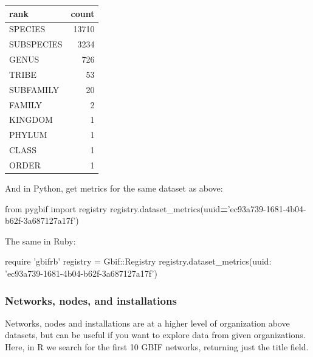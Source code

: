 \documentclass[author-year, review, 11pt]{components/elsarticle} %
\newenvironment{Shaded}{\begin{snugshade}}{\end{snugshade}}
\newcommand{\DataTypeTok}[1]{\textcolor[rgb]{0.13,0.29,0.53}{#1}}
\newcommand{\StringTok}[1]{\textcolor[rgb]{0.31,0.60,0.02}{#1}}
\newcommand{\ImportTok}[1]{#1}
\newcommand{\OperatorTok}[1]{\textcolor[rgb]{0.81,0.36,0.00}{\textbf{#1}}}
\newcommand{\NormalTok}[1]{#1}
\begin{document}
\begin{longtable}[]{@{}lr@{}}
\toprule
rank & count\tabularnewline
\midrule
\endhead
SPECIES & 13710\tabularnewline
SUBSPECIES & 3234\tabularnewline
GENUS & 726\tabularnewline
TRIBE & 53\tabularnewline
SUBFAMILY & 20\tabularnewline
FAMILY & 2\tabularnewline
KINGDOM & 1\tabularnewline
PHYLUM & 1\tabularnewline
CLASS & 1\tabularnewline
ORDER & 1\tabularnewline
\bottomrule
\end{longtable}

And in Python, get metrics for the same dataset as above:

\begin{Shaded}
\begin{Highlighting}[]
\ImportTok{from}\NormalTok{ pygbif }\ImportTok{import}\NormalTok{ registry}
\NormalTok{registry.dataset_metrics(uuid}\OperatorTok{=}\StringTok{'ec93a739-1681-4b04-b62f-3a687127a17f'}\NormalTok{)}
\end{Highlighting}
\end{Shaded}

The same in Ruby:

\begin{Shaded}
\begin{Highlighting}[]
\NormalTok{require }\StringTok{'gbifrb'}
\NormalTok{registry = }\DataTypeTok{Gbif}\NormalTok{::}\DataTypeTok{Registry}
\NormalTok{registry.dataset_metrics(}\StringTok{uuid: 'ec93a739-1681-4b04-b62f-3a687127a17f'}\NormalTok{)}
\end{Highlighting}
\end{Shaded}

\subsubsection{Networks, nodes, and
installations}\label{networks-nodes-and-installations}

Networks, nodes and installations are at a higher level of organization
above datasets, but can be useful if you want to explore data from given
organizations. Here, in R we search for the first 10 GBIF networks,
returning just the title field.
\end{document}
